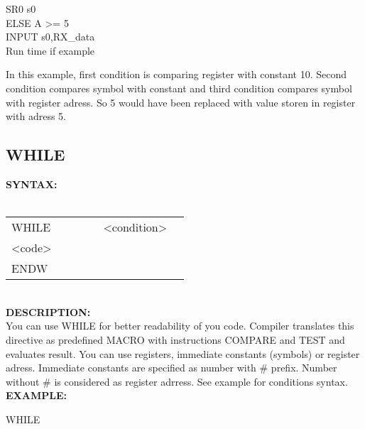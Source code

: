 {\begin{code}[h!]
                                    { \color{highlight_instruction}   SR0   s0 }\\
                                    { \color{highlight_comment}  ELSE} { \color{highlight_constant}   A >= 5 }\\
                                    { \color{highlight_instruction}   INPUT   s0,RX\_data }\\
                                \caption{Run time if example}
                        \end{code}
                In this example, first condition is comparing register with constant 10. Second condition compares symbol with constant and third condition compares
                symbol with register adress. So 5 would have been replaced with value storen in register with adress 5.
                \subsection{WHILE}
                    \textbf{SYNTAX:}\\
                    \\ {
                        \texttt{}
                            \begin{tabular}[h!]{llll}
                                { \color{highlight_directive} WHILE } & \verb'     ' &
                                { \color{highlight_constant} <condition> }\\
                                { \color{highlight_symbol} <code> }\\
                                { \color{highlight_directive} ENDW }
                            \end{tabular}
                        }\\
                    \textbf{DESCRIPTION:}\\
                    You can use WHILE for better readability of you code. Compiler translates this directive as predefined MACRO with instructions COMPARE and TEST and
                    evaluates result. You can use registers, immediate constants (symbols) or register adress. Immediate constants are specified as number with \# prefix.
                    Number without \# is considered as register adrress. See example for conditions syntax.
                    \textbf{EXAMPLE:}\\
                            \begin{code}[h!]
                                    { \color{highlight_directive} WHILE  }

\end{code}}

